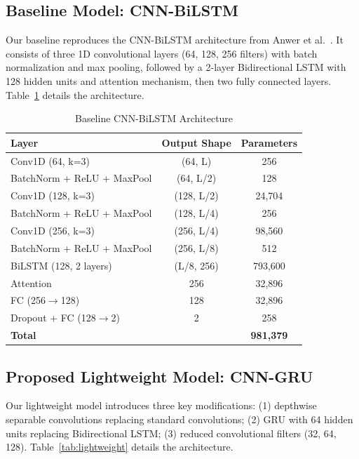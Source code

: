 \documentclass[preprint,12pt]{elsarticle}
\begin{document}
\subsection{Baseline Model: CNN-BiLSTM}
\label{sec:baseline}

Our baseline reproduces the CNN-BiLSTM architecture from Anwer et al.~\cite{anwer2025advanced}. It consists of three 1D convolutional layers (64, 128, 256 filters) with batch normalization and max pooling, followed by a 2-layer Bidirectional LSTM with 128 hidden units and attention mechanism, then two fully connected layers. Table~\ref{tab:baseline} details the architecture.

\begin{table}[hbt]
\centering
\caption{Baseline CNN-BiLSTM Architecture}
\label{tab:baseline}
\begin{tabular}{lcc}
\toprule
Layer & Output Shape & Parameters \\
\midrule
Conv1D (64, k=3) & (64, L) & 256 \\
BatchNorm + ReLU + MaxPool & (64, L/2) & 128 \\
Conv1D (128, k=3) & (128, L/2) & 24,704 \\
BatchNorm + ReLU + MaxPool & (128, L/4) & 256 \\
Conv1D (256, k=3) & (256, L/4) & 98,560 \\
BatchNorm + ReLU + MaxPool & (256, L/8) & 512 \\
BiLSTM (128, 2 layers) & (L/8, 256) & 793,600 \\
Attention & 256 & 32,896 \\
FC (256$\rightarrow$128) & 128 & 32,896 \\
Dropout + FC (128$\rightarrow$2) & 2 & 258 \\
\midrule
\textbf{Total} & & \textbf{981,379} \\
\bottomrule
\end{tabular}
\end{table}

\subsection{Proposed Lightweight Model: CNN-GRU}
\label{sec:lightweight}

Our lightweight model introduces three key modifications: (1) depthwise separable convolutions replacing standard convolutions; (2) GRU with 64 hidden units replacing Bidirectional LSTM; (3) reduced convolutional filters (32, 64, 128). Table~\ref{tab:lightweight} details the architecture.
\end{document}
